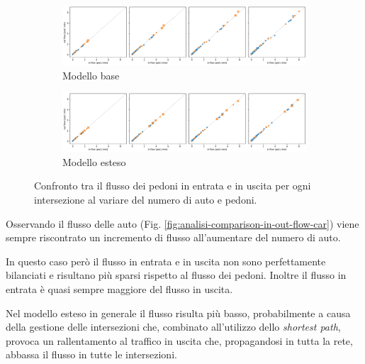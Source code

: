 \begin{figure}[p]
    \centering
    \begin{subfigure}{\textwidth}
        \centering
        \includegraphics[width=\textwidth]{images/analisi/comparison-base-in-out-flow-ped.png}
        \caption{Modello base}
    \end{subfigure}
    
    \begin{subfigure}{\textwidth}
        \centering
        \includegraphics[width=\textwidth]{images/analisi/comparison-new-in-out-flow-ped.png}
        \caption{Modello esteso}
    \end{subfigure}
    \caption{
        Confronto tra il flusso dei pedoni in entrata e in uscita per ogni intersezione al variare del numero di auto e pedoni.
    }
    \label{fig:analisi-comparison-in-out-flow-ped}
\end{figure}

Osservando il flusso delle auto (Fig. \ref{fig:analisi-comparison-in-out-flow-car}) 
viene sempre riscontrato un incremento di flusso all'aumentare del numero di auto.

In questo caso però il flusso in entrata e in uscita non sono perfettamente bilanciati e risultano più sparsi rispetto al flusso dei pedoni.
Inoltre il flusso in entrata è quasi sempre maggiore del flusso in uscita.

Nel modello esteso in generale il flusso risulta più basso,
probabilmente a causa della gestione delle intersezioni che, combinato all'utilizzo dello \textit{shortest path}, 
provoca un rallentamento al traffico in uscita che, propagandosi in tutta la rete, abbassa il flusso in tutte le intersezioni.

